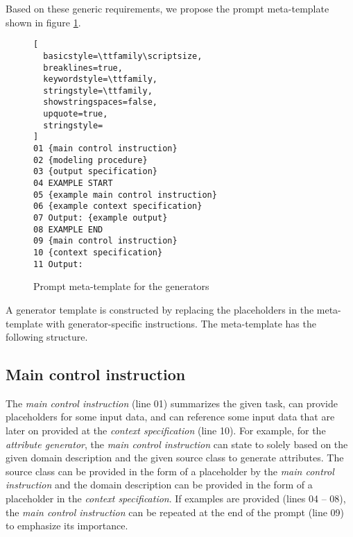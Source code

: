 Based on these generic requirements, we propose the prompt meta-template shown in figure \ref{fig:meta-templates}.

\begin{figure}[!h]
    \centering
\begin{lstlisting}[
  basicstyle=\ttfamily\scriptsize,
  breaklines=true,
  keywordstyle=\ttfamily,
  stringstyle=\ttfamily,
  showstringspaces=false,
  upquote=true,
  stringstyle=
]
01 {main control instruction}
02 {modeling procedure}
03 {output specification}
04 EXAMPLE START
05 {example main control instruction}
06 {example context specification}
07 Output: {example output}
08 EXAMPLE END
09 {main control instruction}
10 {context specification}
11 Output:
\end{lstlisting}
    \caption{\centering Prompt meta-template for the generators}
    \label{fig:meta-templates}
\end{figure}


A generator template is constructed by replacing the placeholders in the meta-template with generator-specific instructions. The meta-template has the following structure.





\subsection{Main control instruction}

The \emph{main control instruction} (line 01) summarizes the given task, can provide placeholders for some input data, and can reference some input data that are later on provided at the \emph{context specification} (line 10). For example, for the \emph{attribute generator}, the \emph{main control instruction} can state to solely based on the given domain description and the given source class to generate attributes. The source class can be provided in the form of a placeholder by the \emph{main control instruction} and the domain description can be provided in the form of a placeholder in the \emph{context specification}. If examples are provided (lines 04 -- 08), the \emph{main control instruction} can be repeated at the end of the prompt (line 09) to emphasize its importance.


